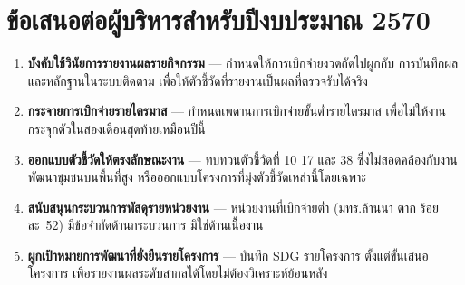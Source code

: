 \section*{ข้อเสนอต่อผู้บริหารสำหรับปีงบประมาณ 2570}
\begin{enumerate}[leftmargin=1.6em,itemsep=2pt]
  \item \textbf{บังคับใช้วินัยการรายงานผลรายกิจกรรม} --- กำหนดให้การเบิกจ่ายงวดถัดไปผูกกับ
        การบันทึกผลและหลักฐานในระบบติดตาม เพื่อให้ตัวชี้วัดที่รายงานเป็นผลที่ตรวจรับได้จริง
  \item \textbf{กระจายการเบิกจ่ายรายไตรมาส} --- กำหนดเพดานการเบิกจ่ายขั้นต่ำรายไตรมาส
        เพื่อไม่ให้งานกระจุกตัวในสองเดือนสุดท้ายเหมือนปีนี้
  \item \textbf{ออกแบบตัวชี้วัดให้ตรงลักษณะงาน} --- ทบทวนตัวชี้วัดที่ 10 17 และ 38
        ซึ่งไม่สอดคล้องกับงานพัฒนาชุมชนบนพื้นที่สูง หรือออกแบบโครงการที่มุ่งตัวชี้วัดเหล่านี้โดยเฉพาะ
  \item \textbf{สนับสนุนกระบวนการพัสดุรายหน่วยงาน} --- หน่วยงานที่เบิกจ่ายต่ำ
        (มทร.ล้านนา ตาก ร้อยละ~52) มีข้อจำกัดด้านกระบวนการ มิใช่ด้านเนื้องาน
  \item \textbf{ผูกเป้าหมายการพัฒนาที่ยั่งยืนรายโครงการ} --- บันทึก SDG รายโครงการ
        ตั้งแต่ขั้นเสนอโครงการ เพื่อรายงานผลระดับสากลได้โดยไม่ต้องวิเคราะห์ย้อนหลัง
\end{enumerate}
